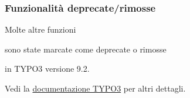 \begin{frame}[fragile]
	\frametitle{Funzionalità deprecate/rimosse}

	\vspace{0.6cm}
	\begin{center}
		Molte altre funzioni
	\end{center}
	\vspace{-0.8cm}
	\begin{center}
		sono state marcate come deprecate o rimosse
	\end{center}
	\vspace{-0.8cm}
	\begin{center}
		in TYPO3 versione 9.2.
	\end{center}
	\vspace{-0.6cm}
	\begin{center}
		Vedi la \href{https://docs.typo3.org/typo3cms/extensions/core/latest/Changelog/9.3/Index.html#deprecation}{documentazione TYPO3} per altri dettagli.
	\end{center}

\end{frame}

